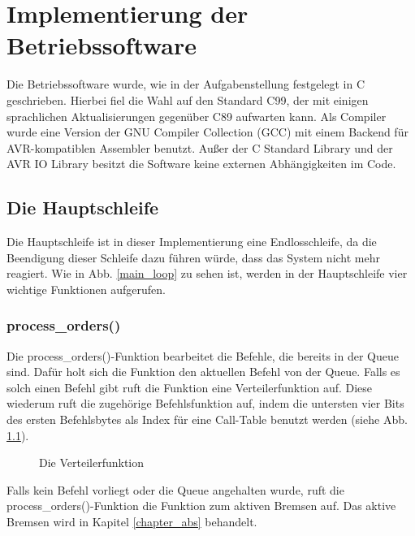 \chapter{Implementierung der Betriebssoftware}
Die Betriebssoftware wurde, wie in der Aufgabenstellung festgelegt in C geschrieben.
Hierbei fiel die Wahl auf den Standard C99, der mit einigen sprachlichen
Aktualisierungen gegenüber C89 aufwarten kann. Als Compiler wurde eine Version der
GNU Compiler Collection (GCC) mit einem Backend für AVR-kompatiblen Assembler benutzt.
Außer der C Standard Library und der AVR IO Library besitzt die Software keine externen
Abhängigkeiten im Code.
\section{Die Hauptschleife}
Die Hauptschleife ist in dieser Implementierung eine Endlosschleife, da die Beendigung dieser
Schleife dazu führen würde, dass das System nicht mehr reagiert.
Wie in Abb. \ref{main_loop} zu sehen ist, werden in der Hauptschleife vier wichtige Funktionen
aufgerufen.
\subsection{process\_orders()}
Die process\_\-orders()\--Funktion bearbeitet die Befehle, die bereits in der Queue sind. Dafür holt
sich die Funktion den aktuellen Befehl von der Queue. Falls es solch einen Befehl gibt ruft die
Funktion eine Verteilerfunktion auf. Diese wiederum ruft die zugehörige Befehlsfunktion auf, indem
die untersten vier Bits des ersten Befehlsbytes als Index für eine Call-Table benutzt werden (siehe
Abb. \ref{dispatch_function}).\\
\begin{figure}[htb]
 \centering
 \caption{\label{dispatch_function}Die Verteilerfunktion}
\end{figure}
Falls kein Befehl vorliegt oder die Queue angehalten wurde, ruft die process\_\-orders()-Funktion die
Funktion zum aktiven Bremsen auf. Das aktive Bremsen wird in Kapitel \ref{chapter_abs} behandelt.
